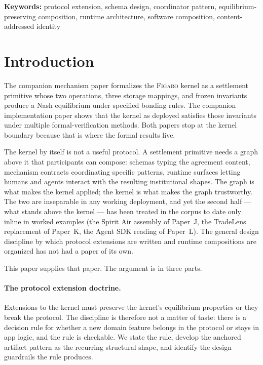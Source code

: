 \documentclass[11pt,a4paper]{article}
\theoremstyle{definition}
\theoremstyle{remark}
\newcommand{\figaro}{\textsc{Figaro}}
\begin{document}
\medskip
\noindent\textbf{Keywords:}
protocol extension, schema design, coordinator pattern, equilibrium-preserving composition,
runtime architecture, software composition, content-addressed identity

\section{Introduction}
\label{sec:intro}

The companion mechanism paper formalizes the \figaro{} kernel as a
settlement primitive whose two operations, three storage mappings,
and frozen invariants produce a Nash equilibrium under specified
bonding rules. The companion implementation paper shows that the
kernel as deployed satisfies those invariants under multiple
formal-verification methods. Both papers stop at the kernel
boundary because that is where the formal results live.

The kernel by itself is not a useful protocol. A settlement primitive
needs a graph above it that participants can compose: schemas typing
the agreement content, mechanism contracts coordinating specific
patterns, runtime surfaces letting humans and agents interact with
the resulting institutional shapes. The graph is what makes the
kernel applied; the kernel is what makes the graph trustworthy. The
two are inseparable in any working deployment, and yet the second
half — what stands above the kernel — has been treated in the corpus
to date only inline in worked examples (the Spirit Air assembly of
Paper~J, the TradeLens replacement of Paper~K, the Agent SDK reading
of Paper~L). The general design discipline by which protocol
extensions are written and runtime compositions are organized has
not had a paper of its own.

This paper supplies that paper. The argument is in three parts.

\paragraph{The protocol extension doctrine.}
Extensions to the kernel must preserve the kernel's equilibrium
properties or they break the protocol. The discipline is therefore
not a matter of taste: there is a decision rule for whether a new
domain feature belongs in the protocol or stays in app logic, and
the rule is checkable. We state the rule, develop the anchored
artifact pattern as the recurring structural shape, and identify
the design guardrails the rule produces.
\end{document}
